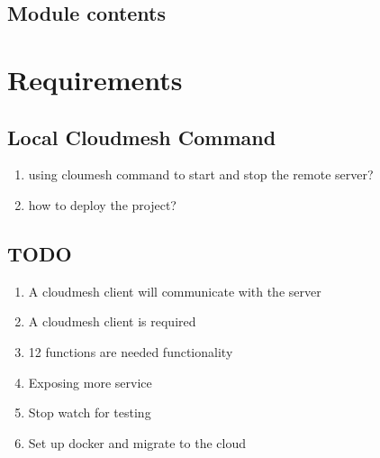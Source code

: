 \documentclass[letterpaper,10pt,english]{sphinxmanual}
\begin{document}
\section{Module contents}
\label{\detokenize{tests:module-tests}}\label{\detokenize{tests:module-contents}}

\chapter{Requirements}
\label{\detokenize{progress:requirements}}\label{\detokenize{progress::doc}}

\section{Local Cloudmesh Command}
\label{\detokenize{progress:local-cloudmesh-command}}\begin{enumerate}
%
\item {} 
using cloumesh command to start and stop the remote server?

\item {} 
how to deploy the project?

\end{enumerate}


\section{TODO}
\label{\detokenize{progress:todo}}\begin{enumerate}
%
\item {} 
A cloudmesh client will communicate with the server

\item {} 
A cloudmesh client is required

\item {} 
12 functions are needed functionality

\item {} 
Exposing more service

\item {} 
Stop watch for testing

\item {} 
Set up docker and migrate to the cloud

\end{enumerate}
\end{document}
